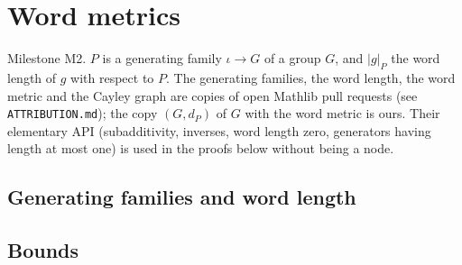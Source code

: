 \chapter{Word metrics}
\label{chap:word-metric}

Milestone M2. $P$ is a generating family $\iota \to G$ of a group $G$, and $|g|_P$ the word
length of $g$ with respect to $P$. The generating families, the word length, the word metric and
the Cayley graph are copies of open Mathlib pull requests (see \texttt{ATTRIBUTION.md}); the
copy $(G, d_P)$ of $G$ with the word metric is ours. Their elementary API (subadditivity, inverses,
word length zero, generators having length at most one) is used in the proofs below without
being a node.

\section{Generating families and word length}



\section{Bounds}



